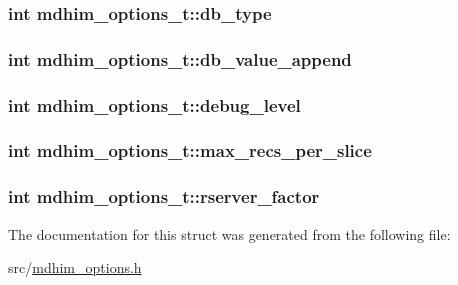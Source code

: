 \hypertarget{structmdhim__options__t_aca30ea829be8cddac409433a2cc42465}{
\subsubsection[{db\-\_\-type}]{\setlength{\rightskip}{0pt plus 5cm}int mdhim\-\_\-options\-\_\-t\-::db\-\_\-type}}\label{structmdhim__options__t_aca30ea829be8cddac409433a2cc42465}
\hypertarget{structmdhim__options__t_a6bad7d9c2713672eaed657aac45fae5c}{
\subsubsection[{db\-\_\-value\-\_\-append}]{\setlength{\rightskip}{0pt plus 5cm}int mdhim\-\_\-options\-\_\-t\-::db\-\_\-value\-\_\-append}}\label{structmdhim__options__t_a6bad7d9c2713672eaed657aac45fae5c}
\hypertarget{structmdhim__options__t_a4844203cf92b3d109303153db34114dd}{
\subsubsection[{debug\-\_\-level}]{\setlength{\rightskip}{0pt plus 5cm}int mdhim\-\_\-options\-\_\-t\-::debug\-\_\-level}}\label{structmdhim__options__t_a4844203cf92b3d109303153db34114dd}
\hypertarget{structmdhim__options__t_a46baf3b15d0be9c6d0cab276626e2a6e}{
\subsubsection[{max\-\_\-recs\-\_\-per\-\_\-slice}]{\setlength{\rightskip}{0pt plus 5cm}int mdhim\-\_\-options\-\_\-t\-::max\-\_\-recs\-\_\-per\-\_\-slice}}\label{structmdhim__options__t_a46baf3b15d0be9c6d0cab276626e2a6e}
\hypertarget{structmdhim__options__t_a63c13fdd85eb946ac15fdeb81df96ad8}{
\subsubsection[{rserver\-\_\-factor}]{\setlength{\rightskip}{0pt plus 5cm}int mdhim\-\_\-options\-\_\-t\-::rserver\-\_\-factor}}\label{structmdhim__options__t_a63c13fdd85eb946ac15fdeb81df96ad8}


The documentation for this struct was generated from the following file\-:\begin{DoxyCompactItemize}
\item 
src/\hyperlink{mdhim__options_8h}{mdhim\-\_\-options.\-h}\end{DoxyCompactItemize}
